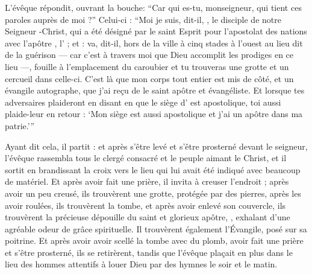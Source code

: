 L'évêque répondit, ouvrant la  bouche: 
\enquote{Car qui es-tu, monseigneur, qui tient ces paroles auprès de moi ?}
Celui-ci : \enquote{Moi je suis, dit-il, , le disciple de notre Seigneur -Christ,
qui a été désigné par le saint Esprit pour l'apostolat des nations avec l'apôtre , l' ;
et  : va, dit-il, hors de la ville à cinq stades à l'ouest 
au lieu dit de la guérison --- car c'est à travers moi que Dieu accomplit les prodiges en ce lieu ---, 
fouille à l'emplacement du caroubier et 
 tu trouveras une grotte et un cercueil dans celle-ci.
C'est là que mon corps tout entier est mis de côté, et un évangile autographe,  
 que j'ai reçu de  le saint apôtre et évangéliste.
Et lorsque tes adversaires plaideront en disant en  
que le siège d' est apostolique, toi aussi plaide-leur en retour : \enquote{Mon siège est aussi apostolique et j'ai un apôtre dans ma patrie.}}

Ayant dit cela, il partit : et après s'être levé et s'être prosterné devant le seigneur, l'évêque 
rassembla tous le clergé consacré et le peuple aimant le Christ, et il sortit en brandissant la croix vers le lieu qui lui avait été indiqué avec beaucoup de matériel.
Et après avoir fait une prière, il invita à creuser l'endroit ;  après avoir un peu creusé, ils trouvèrent une grotte, protégée par des pierres,  après les avoir roulées, ils trouvèrent la tombe, et après avoir enlevé son couvercle, ils trouvèrent la précieuse dépouille du saint et glorieux apôtre, , exhalant d'une agréable odeur de grâce spirituelle.  
Il trouvèrent également l'Évangile, posé sur sa poitrine.
Et après avoir avoir scellé la tombe avec du plomb, avoir fait une prière et s'être prosterné, ils se retirèrent, tandis que l'évêque plaçait en plus dans le lieu des hommes attentifs à louer Dieu par des hymnes le soir et le matin.

